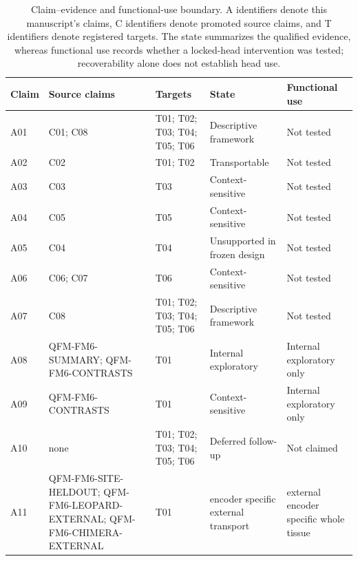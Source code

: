 \begin{table}[H]
\centering
\scriptsize
\caption{Claim--evidence and functional-use boundary. A identifiers denote this manuscript's claims, C identifiers denote promoted source claims, and T identifiers denote registered targets. The state summarizes the qualified evidence, whereas functional use records whether a locked-head intervention was tested; recoverability alone does not establish head use.}
\label{tab:supp-claim-matrix}
\begin{tabular}{@{}p{}p{}p{}p{}p{}@{}}
\toprule
Claim & Source claims & Targets & State & Functional use \\
\midrule
A01 & C01; C08 & T01; T02; T03; T04; T05; T06 & Descriptive framework & Not tested \\
A02 & C02 & T01; T02 & Transportable & Not tested \\
A03 & C03 & T03 & Context-sensitive & Not tested \\
A04 & C05 & T05 & Context-sensitive & Not tested \\
A05 & C04 & T04 & Unsupported in frozen design & Not tested \\
A06 & C06; C07 & T06 & Context-sensitive & Not tested \\
A07 & C08 & T01; T02; T03; T04; T05; T06 & Descriptive framework & Not tested \\
A08 & QFM-FM6-SUMMARY; QFM-FM6-CONTRASTS & T01 & Internal exploratory & Internal exploratory only \\
A09 & QFM-FM6-CONTRASTS & T01 & Context-sensitive & Internal exploratory only \\
A10 & none & T01; T02; T03; T04; T05; T06 & Deferred follow-up & Not claimed \\
A11 & QFM-FM6-SITE-HELDOUT; QFM-FM6-LEOPARD-EXTERNAL; QFM-FM6-CHIMERA-EXTERNAL & T01 & encoder specific external transport & external encoder specific whole tissue \\
\bottomrule
\end{tabular}
\end{table}
